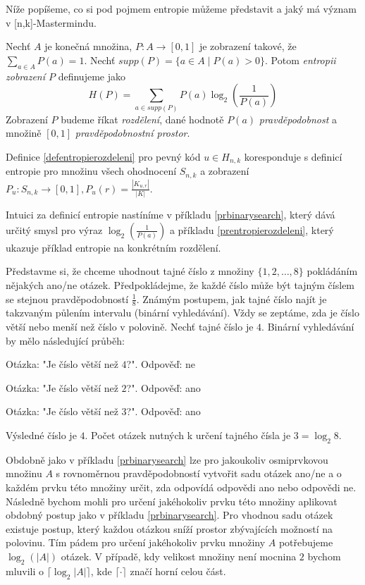 Níže popíšeme, co si pod pojmem entropie můžeme představit a jaký má význam v [n,k]-Mastermindu.

\begin{definice}[Entropie]\label{defentropie}
  Nechť $A$ je konečná množina, $P \colon A \to [0,1]$ je zobrazení takové, že $\sum_{a \in A} P(a) = 1$. Nechť $supp(P) = \{ a \in A \mid P(a) > 0\}$. Potom \emph{entropii zobrazení $P$} definujeme jako 
  \[H(P) = \sum_{a \in supp(P)}P(a)\log_2\left(\frac{1}{P(a)}\right)\]
  Zobrazení $P$ budeme říkat \emph{rozdělení}, dané hodnotě $P(a)$ \emph{pravděpodobnost} a množině $[0,1]$ \emph{pravděpodobnostní prostor}. 
\end{definice}

\begin{pozn}
    Definice \ref{defentropierozdeleni} pro pevný kód $u\in H_{n,k}$ koresponduje s definicí entropie pro množinu všech ohodnocení $S_{n,k}$ a  zobrazení $P_u\colon S_{n,k} \to [0,1], P_u(r) = \frac{|K_{u,r}|}{|K|}$.
\end{pozn}

Intuici za definicí entropie nastíníme v příkladu \ref{prbinarysearch}, který dává určitý smysl pro výraz $\log_2\left(\frac{1}{P(a)}\right)$ a příkladu \ref{prentropierozdeleni}, který ukazuje příklad entropie na konkrétním rozdělení.

\begin{prikl}\label{prbinarysearch}
Představme si, že chceme uhodnout tajné číslo z množiny $\{1,2,\dots,8\}$ pokládáním nějakých ano/ne otázek. Předpokládejme, že každé číslo může být tajným číslem se stejnou pravděpodobností $\frac{1}{8}$. Známým postupem, jak tajné číslo najít je takzvaným půlením intervalu (binární vyhledávání). Vždy se zeptáme, zda je číslo větší nebo menší než číslo v polovině. Nechť tajné číslo je $4$. Binární vyhledávání by mělo následující průběh:

Otázka: "Je číslo větší než $4$?". 
Odpověď: ne

Otázka: "Je číslo větší než $2$?". 
Odpověď: ano

Otázka: "Je číslo větší než $3$?". 
Odpověď: ano

Výsledné číslo je $4$. Počet otázek nutných k určení tajného čísla je $3 = \log_2 8$.
\end{prikl}

\begin{pozn}\label{poznotazkynamnozinu}
Obdobně jako v příkladu \ref{prbinarysearch} lze pro jakoukoliv osmiprvkovou množinu $A$ s rovnoměrnou pravděpodobností vytvořit sadu otázek ano/ne a o každém prvku této množiny určit, zda odpovídá odpovědi ano nebo odpovědi ne. Následně bychom mohli pro určení jakéhokoliv prvku této množiny aplikovat obdobný postup jako v příkladu \ref{prbinarysearch}. Pro vhodnou sadu otázek existuje postup, který každou otázkou sníží prostor zbývajících možností na polovinu. Tím pádem pro určení jakéhokoliv prvku množiny $A$ potřebujeme $\log_2(|A|)$ otázek. V případě, kdy velikost množiny není mocnina $2$ bychom mluvili o $\lceil \log_2 |A| \rceil$, kde $\lceil \cdot \rceil$ značí horní celou část. 
\end{pozn}

